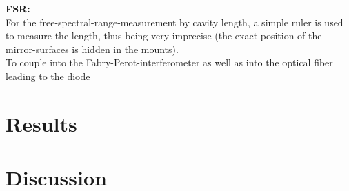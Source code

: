 \documentclass[12pt,a4paper]{article}
\begin{document}
\begin{multicols}{2}
\noindent \textbf{FSR:}\\
For the free-spectral-range-measurement by cavity length, a simple ruler is used to measure the length, thus being very imprecise (the exact position of the mirror-surfaces is hidden in the mounts).\\
To couple into the Fabry-Perot-interferometer as well as into the optical fiber leading to the diode

\section{Results}


\section{Discussion}


%
%
\end{multicols}
\end{document}
